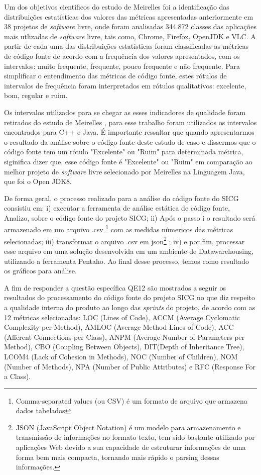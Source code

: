 Um dos objetivos científicos do estudo de Meirelles \cite{Meirelles2013} foi a identificação das distribuições estatísticas dos valores das métricas apresentadas anteriormente em 38 projetos de \textit{software} livre, onde foram analisadas 344.872 classes das aplicações mais utlizadas de \textit{software} livre, tais como, Chrome, Firefox, OpenJDK e VLC. A partir de cada uma das distribuições estatísticas foram classificadas as métricas de código fonte de acordo com a frequência dos valores apresentados,
com os intervalos: muito frequente, frequente, pouco frequente e não frequente. Para simplificar o entendimento das métricas de código fonte,  estes rótulos de
intervalos de frequência foram interpretados em rótulos qualitativos: excelente, bom, regular e ruim.


Os intervalos utilizados para se chegar as esses indicadores de qualidade foram retirados do
estudo de Meirelles \cite{Meirelles2013}, para esse trabalho foram utilizados os intervalos encontrados para C++ e Java. É importante ressaltar que quando apresentarmos o resultado da análise sobre o código fonte deste estudo de caso e dissermos que o código fonte tem um rótulo "Excelente" ou "Ruim" para determinada métrica, siginifica dizer que, esse código fonte é "Excelente" ou "Ruim" em comparação ao melhor projeto de \textit{software} livre selecionado por Meirelles \cite{Meirelles2013} na Linguagem Java, que foi o Open JDK8.



De forma geral, o processo realizado para a análise do código fonte do SICG consistiu em: i) executar a ferramenta de análise estática de código fonte, Analizo, sobre o código fonte do projeto SICG; ii) Após o passo i o resultado será armazenado em um arquivo .csv \footnote{Comma-separated values (ou CSV) é um formato de arquivo que armazena dados tabelados} com as medidas númericos das métricas selecionadas; iii) transformar o arquivo .csv em json\footnote{JSON (JavaScript Object Notation) é um modelo para armazenamento e transmissão de informações no formato texto, tem sido bastante utilizado por aplicações Web devido a sua capacidade de estruturar informações de uma forma bem mais compacta, tornando mais rápido o parsing dessas informações.} ; iv) e por fim, processar esse arquivo em uma solução desenvolvida em um ambiente de Datawarehousing, utilizando a ferramenta Pentaho. Ao final desse processo, temos como resultado os gráficos para análise. 

A fim de responder a questão específica QE12 são mostrados a seguir os resultados do processamento do código fonte do projeto SICG no que diz respeito a qualidade interna do produto ao longo das \textit{sprints} do projeto, 
de acordo com as 12 métricas selecionadas: LOC (Lines of Code), ACCM (Average Cyclomatic Complexity per Method), AMLOC (Average Method Lines of Code), ACC (Afferent Connections per Class), ANPM (Average Number of Parameters per Method),
CBO (Coupling Between Objects), DIT(Depth of Inheritance Tree), LCOM4 (Lack of Cohesion in Methods), NOC (Number of Children), NOM (Number of Methods), NPA (Number of Public Attributes) e RFC (Response For a Class).


